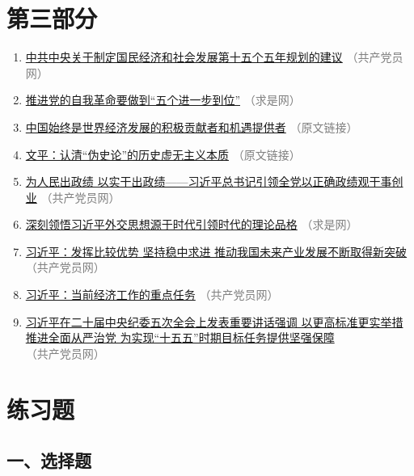 \documentclass[UTF8,11pt,a4paper]{ctexart}
\begin{document}
\section*{第三部分}

\begin{enumerate}[label=\textbf{材料示例\chinese*}, leftmargin=5.2em]
\item \href{https://www.12371.cn/2025/10/28/ARTI1761640401107119.shtml}{中共中央关于制定国民经济和社会发展第十五个五年规划的建议} \textcolor{gray}{（共产党员网）}
\item \href{https://www.qstheory.cn/20251129/5c573dc1d6574c5b8dd814e5403ae88e/c.html}{推进党的自我革命要做到“五个进一步到位”} \textcolor{gray}{（求是网）}
\item \href{https://mp.weixin.qq.com/s/XLDi-vArQj-8JXKCRT-6ZQ}{中国始终是世界经济发展的积极贡献者和机遇提供者} \textcolor{gray}{（原文链接）}
\item \href{https://mp.weixin.qq.com/s/1b_QMoc5TUANlYwCo6RIPA}{文平：认清“伪史论”的历史虚无主义本质} \textcolor{gray}{（原文链接）}
\item \href{https://www.12371.cn/2026/02/27/ARTI1772153945397806.shtml}{为人民出政绩 以实干出政绩——习近平总书记引领全党以正确政绩观干事创业} \textcolor{gray}{（共产党员网）}
\item \href{https://www.qstheory.cn/20260227/c77ea2492a464a9081e2330e2e906b6f/c.html}{深刻领悟习近平外交思想源于时代引领时代的理论品格} \textcolor{gray}{（求是网）}
\item \href{https://www.12371.cn/2026/01/31/ARTI1769849380447546.shtml}{习近平：发挥比较优势 坚持稳中求进 推动我国未来产业发展不断取得新突破} \textcolor{gray}{（共产党员网）}
\item \href{https://www.12371.cn/2026/02/15/ARTI1771139538258762.shtml}{习近平：当前经济工作的重点任务} \textcolor{gray}{（共产党员网）}
\item \href{https://www.12371.cn/2026/01/12/ARTI1768214272707593.shtml}{习近平在二十届中央纪委五次全会上发表重要讲话强调 以更高标准更实举措推进全面从严治党 为实现“十五五”时期目标任务提供坚强保障} \textcolor{gray}{（共产党员网）}
\end{enumerate}

\section*{练习题}

\subsection*{一、选择题}
\end{document}
